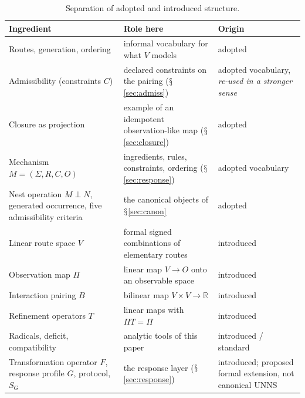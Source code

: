 \documentclass[11pt,a4paper]{article}
\renewcommand{\S}{\ensuremath{\mathsection}}
\newcommand{\RR}{\mathbb{R}}
\theoremstyle{plain}
\theoremstyle{definition}
\begin{document}
\begin{table}[t]
\centering\small
\begin{tabularx}{\textwidth}{@{}p{}Xp{}@{}}
\toprule
Ingredient & Role here & Origin\\
\midrule
Routes, generation, ordering & informal vocabulary for what $V$ models & adopted~\cite{G3}\\
Admissibility (constraints $C$) & declared constraints on the pairing (\S\ref{sec:admiss}) & adopted vocabulary, \emph{re-used in a stronger sense}\\
Closure as projection & example of an idempotent observation-like map (\S\ref{sec:closure}) & adopted~\cite{G7,G5}\\
Mechanism $M=(\Sigma,R,C,O)$ & ingredients, rules, constraints, ordering (\S\ref{sec:response}) & adopted vocabulary~\cite{G3}\\
Nest operation $M\perp N$, generated occurrence, five admissibility criteria & the canonical objects of \S\ref{sec:canon} & adopted~\cite{G11,G12}\\
Linear route space $V$ & formal signed combinations of elementary routes & introduced\\
Observation map $\Pi$ & linear map $V\to O$ onto an observable space & introduced\\
Interaction pairing $B$ & bilinear map $V\times V\to\RR$ & introduced\\
Refinement operators $T$ & linear maps with $\Pi T=\Pi$ & introduced\\
Radicals, deficit, compatibility & analytic tools of this paper & introduced / standard\\
Transformation operator $F$, response profile $G$, protocol, $S_G$ & the response layer (\S\ref{sec:response}) & introduced; proposed formal extension, not canonical UNNS\\
\bottomrule
\end{tabularx}
\caption{Separation of adopted and introduced structure.}\label{tab:adopt}
\end{table}
\end{document}
